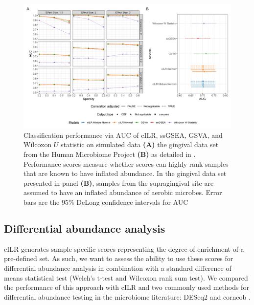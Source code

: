\documentclass[10pt,letterpaper]{article}
\begin{document}
\begin{figure}[!ht]
    \centering
    \includegraphics[width = \textwidth]{figures/sim_data_ss_auc.png}
    \caption{Classification performance via AUC of cILR, ssGSEA, GSVA, and Wilcoxon $U$ statistic on simulated data \textbf{(A)} the gingival data set from the Human Microbiome Project  \textbf{(B)} as detailed in . Performance scores measure whether scores can highly rank samples that are known to have inflated abundance. In the gingival data set presented in panel \textbf{(B)}, samples from the supragingival site are assumed to have an inflated abundance of aerobic microbes. Error bars are the 95\% DeLong confidence intervals for AUC \cite{delong1988}} 
    \label{fig:3}
\end{figure}

\subsection*{Differential abundance analysis}
cILR generates sample-specific scores representing the degree of enrichment of a pre-defined set. As such, we want to assess the ability to use these scores for differential abundance analysis in combination with a standard difference of means statistical test (Welch's t-test and Wilcoxon rank sum test). We compared the performance of this approach with cILR and two commonly used methods for differential abundance testing in the microbiome literature: DESeq2 \cite{love2014} and corncob \cite{martin2020}.   
\end{document}
